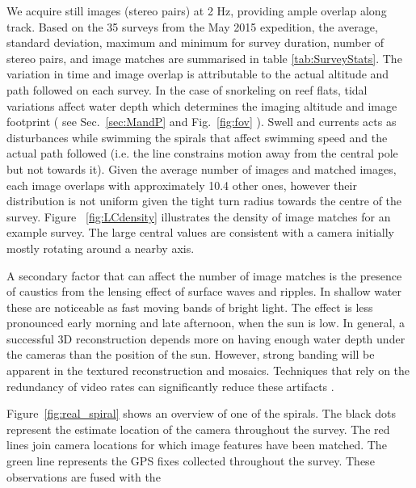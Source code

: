 We acquire still images (stereo pairs) at 2 Hz, providing ample overlap along track. Based on the 35 surveys from the May 2015 expedition, the average, standard deviation, maximum and minimum for survey duration, number of stereo pairs, and image matches are summarised in table \ref{tab:SurveyStats}. The variation in time and image overlap is attributable to the actual altitude and path followed on each survey. In the case of snorkeling on reef flats, tidal variations affect water depth which determines the imaging altitude and image footprint ( see Sec.~\ref{sec:MandP} and Fig.~\ref{fig:fov} ). Swell and currents acts as disturbances while swimming the spirals that affect swimming speed and the actual path followed (i.e. the line constrains motion away from the central pole but not towards it). Given the average number of images and matched images, each image overlaps with approximately 10.4 other ones, however their distribution is not uniform given the tight turn radius towards the centre of the survey. Figure ~\ref{fig:LCdensity} illustrates the density of image matches for an example survey. The large central values are consistent with a camera initially mostly rotating around a nearby axis. 

A secondary factor that can affect the number of image matches is the presence of caustics from the lensing effect of surface waves and ripples. In shallow water these are noticeable as fast moving bands of bright light. The effect is less pronounced early morning and late afternoon, when the sun is low. In general, a successful 3D reconstruction depends more on having enough water depth under the cameras than the position of the sun. However, strong banding will be apparent in the textured reconstruction and mosaics. Techniques that rely on the redundancy of video rates can significantly reduce these artifacts \cite{Gracias_2008}.


Figure~\ref{fig:real_spiral} shows an overview of one of the spirals.  The black dots represent the estimate location of the camera throughout the survey.  The red lines join camera locations for which image features have been matched.  The green line represents the GPS fixes collected throughout the survey.  These observations are fused with the